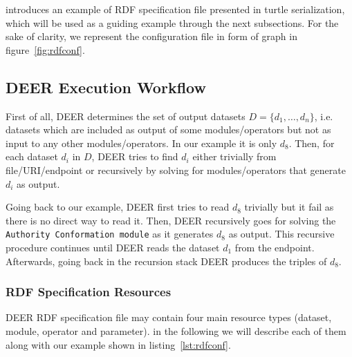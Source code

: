 \documentclass[a4paper,twoside,bibtotoc,abstracton,12pt,BCOR=15mm]{article}
\newcommand{\geolift}{\textsc{DEER}\xspace}
\begin{document}
introduces an example of RDF specification file presented in turtle serialization, which will be used as a guiding example through the next subsections.
For the sake of  clarity, we represent the configuration file in form of graph in figure~\ref{fig:rdfconf}.


\subsection{\geolift Execution Workflow}
First of all, \geolift determines the set of output datasets $D = \{d_1, \dots , d_n\}$, 
i.e. datasets which are included as output of some modules/operators but not as input to any other modules/operators.
In our example it is only $d_8$.
Then, for each dataset $d_i$ in $D$, \geolift tries to find $d_i$ either trivially from file/URI/endpoint or recursively by solving for modules/operators that generate $d_i$ as output.

Going back to our example, \geolift first tries to read $d_8$ trivially but it fail as there is no direct way to read it. 
Then, \geolift recursively goes for solving the \texttt{Authority Conformation module} as it generates $d_8$ as output. 
This recursive procedure continues until \geolift reads the dataset $d_1$ from the endpoint.
Afterwards, going back in the recursion stack \geolift produces the triples of $d_8$.

\subsubsection{RDF Specification Resources} 

\geolift RDF specification file may contain four main resource types (dataset, module, operator and parameter). 
in the following we will describe each of them along with our example shown in listing~\ref{lst:rdfconf}. 

\end{document}
